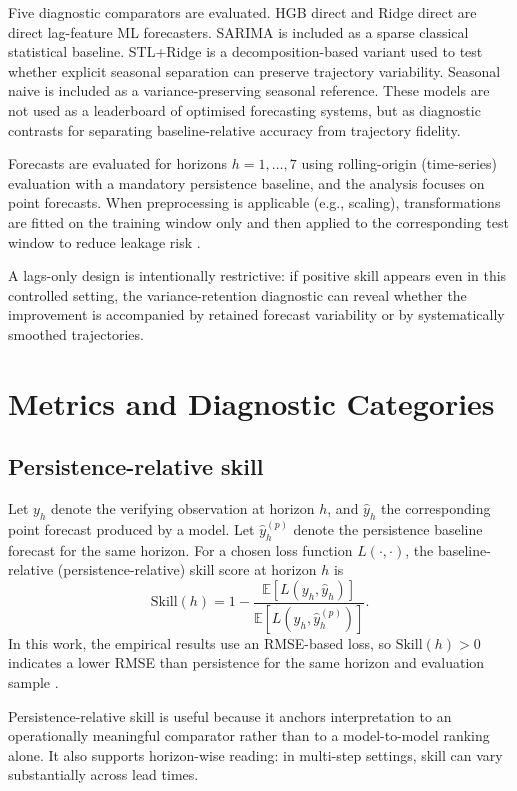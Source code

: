 \documentclass[3p,times,single-column]{elsarticle}
\begin{document}
Five diagnostic comparators are evaluated. HGB direct and Ridge direct are direct lag-feature ML forecasters. SARIMA is included as a sparse classical statistical baseline. STL+Ridge is a decomposition-based variant used to test whether explicit seasonal separation can preserve trajectory variability. Seasonal naive is included as a variance-preserving seasonal reference. These models are not used as a leaderboard of optimised forecasting systems, but as diagnostic contrasts for separating baseline-relative accuracy from trajectory fidelity.

Forecasts are evaluated for horizons \(h=1,\dots,7\) using rolling-origin (time-series) evaluation with a mandatory persistence baseline, and the analysis focuses on point forecasts. When preprocessing is applicable (e.g., scaling), transformations are fitted on the training window only and then applied to the corresponding test window to reduce leakage risk \cite{bergmeir2018,kaufman2012}.

A lags-only design is intentionally restrictive: if positive skill appears even in this controlled setting, the variance-retention diagnostic can reveal whether the improvement is accompanied by retained forecast variability or by systematically smoothed trajectories.

\section{Metrics and Diagnostic Categories}

\subsection{Persistence-relative skill}
Let \(y_h\) denote the verifying observation at horizon \(h\), and \(\hat{y}_h\) the corresponding point forecast produced by a model. Let \(\hat{y}^{(p)}_h\) denote the persistence baseline forecast for the same horizon. For a chosen loss function \(L(\cdot,\cdot)\), the baseline-relative (persistence-relative) skill score at horizon \(h\) is
\begin{equation}
\mathrm{Skill}(h) = 1 - \frac{\mathbb{E}[L(y_h,\hat{y}_h)]}{\mathbb{E}[L(y_h,\hat{y}^{(p)}_h)]}.
\end{equation}
In this work, the empirical results use an RMSE-based loss, so \(\mathrm{Skill}(h)>0\) indicates a lower RMSE than persistence for the same horizon and evaluation sample \cite{hyndman2006}.

Persistence-relative skill is useful because it anchors interpretation to an operationally meaningful comparator rather than to a model-to-model ranking alone. It also supports horizon-wise reading: in multi-step settings, skill can vary substantially across lead times.
\end{document}
